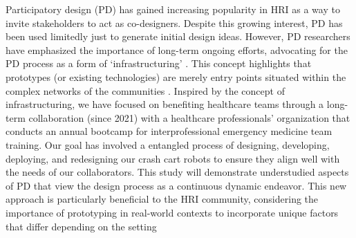 Participatory design (PD) has gained increasing popularity in HRI as a way to invite stakeholders to act as co-designers. %
 Despite this growing interest, PD has been used limitedly just to generate initial design ideas. 
However, PD researchers have emphasized the importance of long-term ongoing efforts, advocating for the PD process as a form of `infrastructuring' \cite{bjorgvinsson2010participatory}. 
This concept highlights that prototypes (or existing technologies) are merely entry points situated within the complex networks of the communities \cite{suchman2002located, star1994steps}. %
Inspired by the concept of infrastructuring, we have focused on benefiting healthcare teams through a long-term collaboration (since 2021) with a healthcare professionals’ organization that conducts an annual bootcamp for interprofessional emergency medicine team training. 
Our goal has involved a entangled process of designing, developing, deploying, and redesigning our crash cart robots to ensure they align well with the needs of our collaborators. This study will demonstrate understudied aspects of PD that view the design process as a continuous dynamic endeavor. 
This new approach is particularly beneficial to the HRI community, considering the importance of prototyping in real-world contexts to incorporate unique factors that differ depending on the setting \cite{lee2010gracefully} %



%
